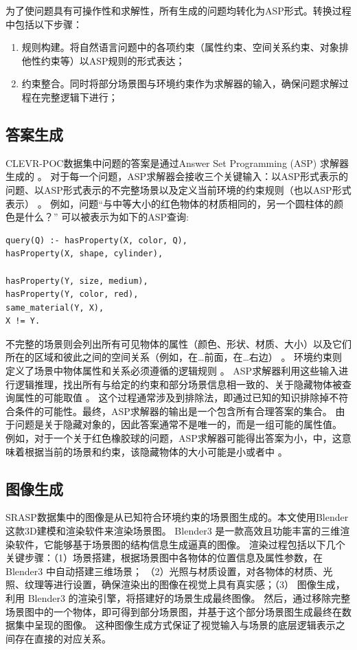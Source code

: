 为了使问题具有可操作性和求解性，所有生成的问题均转化为ASP形式。转换过程中包括以下步骤：
\begin{enumerate}
\item 规则构建。将自然语言问题中的各项约束（属性约束、空间关系约束、对象排他性约束等）以ASP规则的形式表达；
\item 约束整合。同时将部分场景图与环境约束作为求解器的输入，确保问题求解过程在完整逻辑下进行；
\end{enumerate}
\subsection{答案生成}
CLEVR-POC数据集中问题的答案是通过Answer Set Programming (ASP) 求解器生成的 。
对于每一个问题，ASP求解器会接收三个关键输入：以ASP形式表示的问题、以ASP形式表示的不完整场景以及定义当前环境的约束规则（也以ASP形式表示） 。
例如，问题“与中等大小的红色物体的材质相同的，另一个圆柱体的颜色是什么？” 
可以被表示为如下的ASP查询:
\begin{lstlisting}
query(Q) :- hasProperty(X, color, Q),
hasProperty(X, shape, cylinder),

hasProperty(Y, size, medium),
hasProperty(Y, color, red),
same_material(Y, X),
X != Y.
\end{lstlisting}
不完整的场景则会列出所有可见物体的属性（颜色、形状、材质、大小）以及它们所在的区域和彼此之间的空间关系（例如，在…前面，在…右边） 。
环境约束则定义了场景中物体属性和关系必须遵循的逻辑规则 。
ASP求解器利用这些输入进行逻辑推理，找出所有与给定的约束和部分场景信息相一致的、关于隐藏物体被查询属性的可能取值 。
这个过程通常涉及到排除法，即通过已知的知识排除掉不符合条件的可能性。最终，ASP求解器的输出是一个包含所有合理答案的集合。
由于问题是关于隐藏对象的，因此答案通常不是唯一的，而是一组可能的属性值。
例如，对于一个关于红色橡胶球的问题，ASP求解器可能得出答案为{小，中}，这意味着根据当前的场景和约束，该隐藏物体的大小可能是小或者中 。
\subsection{图像生成}
SRASP数据集中的图像是从已知符合环境约束的场景图生成的。本文使用Blender这款3D建模和渲染软件来渲染场景图。
Blender3 是一款高效且功能丰富的三维渲染软件，它能够基于场景图的结构信息生成逼真的图像。
渲染过程包括以下几个关键步骤：（1）场景搭建，根据场景图中各物体的位置信息及属性参数，在 Blender3 中自动搭建三维场景；
（2）光照与材质设置，对各物体的材质、光照、纹理等进行设置，确保渲染出的图像在视觉上具有真实感；（3）
图像生成，利用 Blender3 的渲染引擎，将搭建好的场景生成最终图像。
然后，通过移除完整场景图中的一个物体，即可得到部分场景图，并基于这个部分场景图生成最终在数据集中呈现的图像。
这种图像生成方式保证了视觉输入与场景的底层逻辑表示之间存在直接的对应关系。
